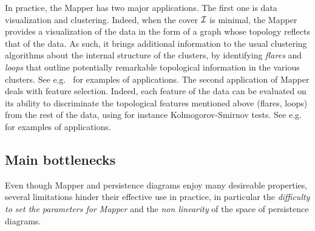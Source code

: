 

In practice, the Mapper has two major applications. The first one is data visualization and clustering.
Indeed, when the cover $\mathcal{I}$ is minimal, the Mapper provides a visualization of the data in the form of a graph whose topology reflects
that of the data. As such, it brings additional information to the usual clustering algorithms 
about the internal structure of the clusters, 
by identifying {\em flares} and {\em loops} that outline potentially remarkable topological information
in the various clusters. See e.g.~\cite{Yao09, Lum13, Sarikonda14, Hinks15} for examples of applications. 
The second application of Mapper deals with feature selection. Indeed,
each feature of the data can be evaluated on its ability to discriminate  
the topological features mentioned above (flares, loops) from the rest of the data, 
using for instance Kolmogorov-Smirnov tests.
See e.g.~\cite{Lum13, Nielson15, Rucco15} for examples of applications.   


\subsection{Main bottlenecks}

Even though Mapper and persistence diagrams enjoy many desireable properties, several limitations
hinder their effective use in practice, in particular the {\em difficulty to set the parameters for Mapper}
and the {\em non linearity} of the space of persistence diagrams. 

